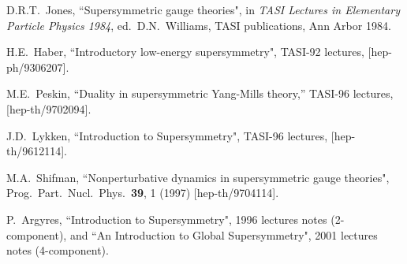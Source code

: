 \documentclass[12pt]{article}
\begin{document}
\begin{thebibliography}{999}
D.R.T.~Jones, 
  ``Supersymmetric gauge theories",
  in {\em TASI Lectures in Elementary Particle Physics 1984},
  ed.~D.N.~Williams, TASI publications, Ann Arbor 1984.

H.E.~Haber, 
  ``Introductory low-energy supersymmetry", 
  TASI-92 lectures, %
  [hep-ph/9306207].



  M.E.~Peskin,
  ``Duality in supersymmetric Yang-Mills theory,''
  TASI-96 lectures,
  [hep-th/9702094].


  
J.D.~Lykken, 
  ``Introduction to Supersymmetry",
  TASI-96 lectures, 
  [hep-th/9612114].

M.A.~Shifman, 
  ``Nonperturbative dynamics in supersymmetric gauge theories", 
  Prog.\ Part.\ Nucl.\ Phys.\  {\bf 39}, 1 (1997)
  [hep-th/9704114].


P.~Argyres, 
  ``Introduction to Supersymmetry", 1996 lectures notes (2-component),
and ``An Introduction to Global Supersymmetry", 2001 lectures notes 
(4-component).


\end{thebibliography}
\end{document}
